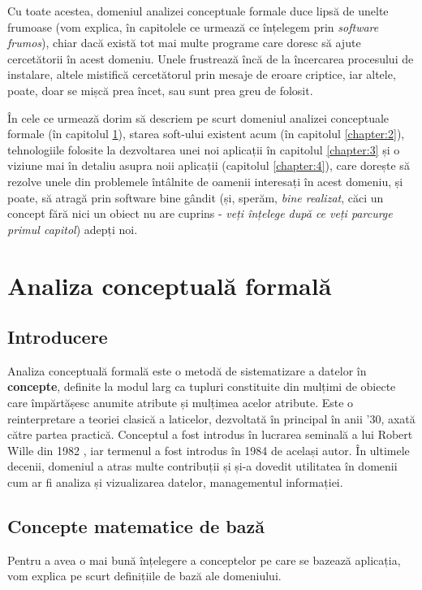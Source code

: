\documentclass[12pt, a4paper, twoside, romanian]{teza-upb}
\begin{document}
  Cu toate acestea, domeniul analizei conceptuale formale duce lipsă de unelte frumoase (vom explica, în capitolele ce urmează ce înțelegem prin \textit{software frumos}), chiar dacă există tot mai multe programe care doresc să ajute cercetătorii în acest domeniu. Unele frustrează încă de la încercarea procesului de instalare, altele mistifică cercetătorul prin mesaje de eroare criptice, iar altele, poate, doar se mișcă prea încet, sau sunt prea greu de folosit.

  În cele ce urmează dorim să descriem pe scurt domeniul analizei conceptuale formale (în capitolul \ref{chapter:1}), starea soft-ului existent acum (în capitolul \ref{chapter:2}), tehnologiile folosite la dezvoltarea unei noi aplicații în capitolul \ref{chapter:3} și o viziune mai în detaliu asupra noii aplicații (capitolul \ref{chapter:4}), care dorește să rezolve unele din problemele întâlnite de oamenii interesați în acest domeniu, și poate, să atragă prin software bine gândit (și, sperăm, \textit{bine realizat}, căci un concept fără nici un obiect nu are cuprins - \textit{veți înțelege după ce veți parcurge primul capitol}) adepți noi.

\chapter{Analiza conceptuală formală}
\label{chapter:1}
  \section{Introducere}
    Analiza conceptuală formală este o metodă de sistematizare a datelor în \textbf{concepte}, definite la modul larg ca tupluri constituite din mulțimi de obiecte care împărtășesc anumite atribute și mulțimea acelor atribute. Este o reinterpretare a teoriei clasică a laticelor, dezvoltată în principal în anii '30, axată către partea practică. Conceptul a fost introdus în lucrarea seminală a lui Robert Wille din 1982 \cite{wille:1982}, iar termenul a fost introdus în 1984 de același autor. În ultimele decenii, domeniul a atras multe contribuții și și-a dovedit utilitatea în domenii cum ar fi analiza și vizualizarea datelor, managementul informației.
  \section{Concepte matematice de bază}
    Pentru a avea o mai bună înțelegere a conceptelor pe care se bazează aplicația, vom explica pe scurt definițiile de bază ale domeniului.
\end{document}
